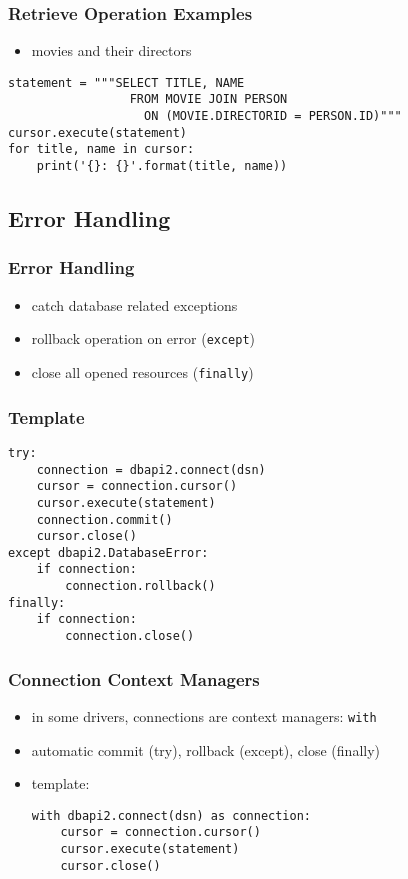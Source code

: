 \documentclass[dvipsnames]{beamer}
\theoremstyle{plain}
\begin{document}
\begin{frame}[fragile]
  \frametitle{Retrieve Operation Examples}

  \begin{itemize}
    \item movies and their directors
  \end{itemize}

  \begin{lstlisting}
statement = """SELECT TITLE, NAME
                 FROM MOVIE JOIN PERSON
                   ON (MOVIE.DIRECTORID = PERSON.ID)"""
cursor.execute(statement)
for title, name in cursor:
    print('{}: {}'.format(title, name))
  \end{lstlisting}
\end{frame}

\subsection{Error Handling}

\begin{frame}
  \frametitle{Error Handling}

  \begin{itemize}
    \item catch database related exceptions

    \medskip
    \item rollback operation on error (\lstinline!except!)
    \item close all opened resources (\lstinline!finally!)
  \end{itemize}
\end{frame}

\begin{frame}[fragile]
  \frametitle{Template}

  \begin{lstlisting}
try:
    connection = dbapi2.connect(dsn)
    cursor = connection.cursor()
    cursor.execute(statement)
    connection.commit()
    cursor.close()
except dbapi2.DatabaseError:
    if connection:
        connection.rollback()
finally:
    if connection:
        connection.close()
  \end{lstlisting}
\end{frame}

\begin{frame}[fragile]
  \frametitle{Connection Context Managers}

  \begin{itemize}
    \item in some drivers, connections are context managers: \lstinline!with!
    \item automatic commit (try), rollback (except), close (finally)

    \medskip
    \item template:
    \begin{lstlisting}
with dbapi2.connect(dsn) as connection:
    cursor = connection.cursor()
    cursor.execute(statement)
    cursor.close()
    \end{lstlisting}
  \end{itemize}
\end{frame}
\end{document}

